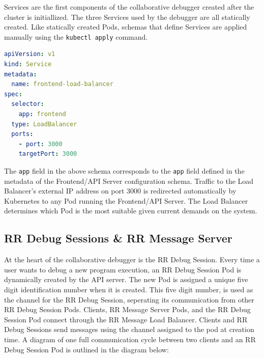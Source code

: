 \documentclass[12pt]{article}
\begin{document}
Services are the first components of the collaborative debugger
created after the cluster is initiallized.  The three Services used by
the debugger are all statically created.  Like statically created
Pods, schemas that define Services are applied manually using the
\lstinline{kubectl apply} command.\\

\begin{lstlisting}[language=YAML,basicstyle=\linespread{0.5}\ttfamily,caption={Frontend Load Balancer Schema},captionpos=b]
apiVersion: v1
kind: Service
metadata:
  name: frontend-load-balancer
spec:
  selector:
    app: frontend
  type: LoadBalancer
  ports:
    - port: 3000
    targetPort: 3000
\end{lstlisting}

The \lstinline{app} field in the above schema corresponds to the
\lstinline{app} field defined in the metadata of the Frontend/API
Server configuration schema.  Traffic to the Load Balancer's external
IP address on port 3000 is redirected automatically by Kubernetes to
any Pod running the Frontend/API Server.  The Load Balancer determines
which Pod is the most suitable given current demands on the system.

\subsection{RR Debug Sessions \& RR Message Server}

At the heart of the collaborative debugger is the RR Debug Session.
Every time a user wants to debug a new program execution, an RR Debug
Session Pod is dynamically created by the API server.  The new Pod is
assigned a unique five digit identification number when it is created.
This five digit number, is used as the channel for the RR Debug
Session, seperating its communication from other RR Debug Session
Pods.  Clients, RR Message Server Pods, and the RR Debug Session Pod
connect through the RR Message Load Balancer.  Clients and RR Debug
Sessions send messages using the channel assigned to the pod at
creation time.  A diagram of one full communication cycle between two
clients and an RR Debug Session Pod is outlined in the diagram below:
\end{document}
